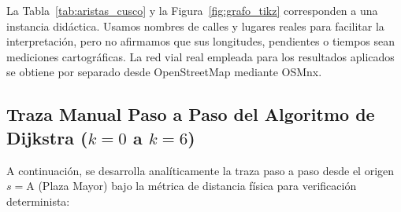 La Tabla~\ref{tab:aristas_cusco} y la Figura~\ref{fig:grafo_tikz} corresponden a una instancia didáctica. Usamos nombres de calles y lugares reales para facilitar la interpretación, pero no afirmamos que sus longitudes, pendientes o tiempos sean mediciones cartográficas. La red vial real empleada para los resultados aplicados se obtiene por separado desde OpenStreetMap mediante OSMnx.



\subsection{Traza Manual Paso a Paso del Algoritmo de Dijkstra ($k=0$ a $k=6$)}
A continuación, se desarrolla analíticamente la traza paso a paso desde el origen $s = \text{A}$ (Plaza Mayor) bajo la métrica de distancia física para verificación determinista:
